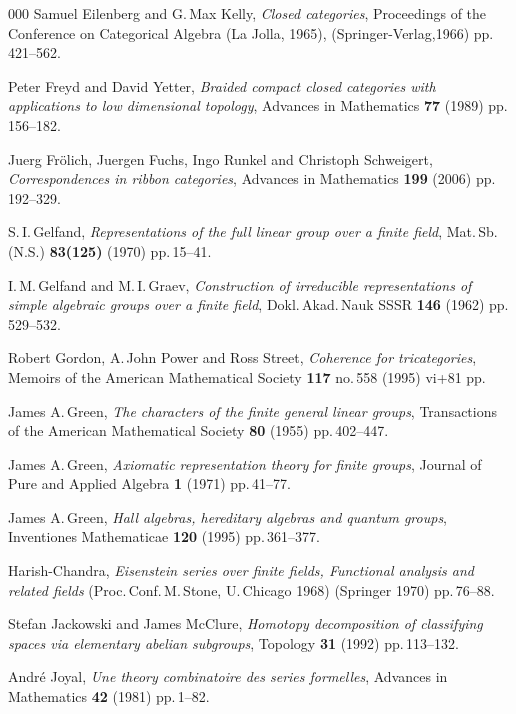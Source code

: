 \documentclass[a4paper,12pt]{article}
\theoremstyle{definition}
\theoremstyle{fact}
\theoremstyle{genquest}
\theoremstyle{step}
\begin{document}
\begin{thebibliography}{000}
 Samuel Eilenberg and G.\,Max Kelly, \textit{Closed categories}, Proceedings of the Conference on Categorical Algebra (La Jolla, 1965), (Springer-Verlag,1966) pp.\,421--562.

 Peter Freyd and David Yetter, \textit{Braided compact closed categories with applications to low dimensional topology}, Advances in Mathematics \textbf{77} (1989) pp.\,156--182.

 Juerg Fr\"olich, Juergen Fuchs, Ingo Runkel and Christoph Schweigert,
\textit{Correspondences in ribbon categories}, Advances in Mathematics \textbf{199} (2006) pp.\,192--329.

 S.\,I.\,Gelfand, \textit{Representations of the full linear group over a finite field}, Mat.\,Sb.\,(N.S.) \textbf{83(125)} (1970) pp.\,15--41.

 I.\,M.\,Gelfand and M.\,I.\,Graev, \textit{Construction of irreducible representations of simple algebraic groups over a finite field}, Dokl.\,Akad.\,Nauk SSSR \textbf{146} (1962) pp.\,529--532.

 Robert Gordon, A.\,John Power and Ross Street, \textit {Coherence for tricategories}, Memoirs of the American Mathematical Society \textbf{117} no.\,558 (1995) vi+81 pp.

 James A.\,Green, \textit{The characters of the finite general linear groups}, Transactions of the American Mathematical Society \textbf{80} (1955) pp.\,402--447. 

 James A.\,Green, \textit{Axiomatic representation theory for finite groups}, Journal of Pure and Applied Algebra \textbf{1} (1971) pp.\,41--77.

 James A.\,Green, \textit{Hall algebras, hereditary algebras and quantum groups}, Inventiones Mathematicae \textbf{120} (1995) pp.\,361--377.

 Harish-Chandra, \textit{Eisenstein series over finite fields, Functional analysis and related fields} (Proc.\,Conf.\,M.\,Stone, U.\,Chicago 1968) (Springer 1970) pp.\,76--88.

 Stefan Jackowski and James McClure, \textit{Homotopy decomposition of classifying spaces via elementary abelian subgroups}, Topology \textbf{31} (1992) pp.\,113--132.

 Andr\'e Joyal, \textit{Une theory combinatoire des series formelles}, Advances in Mathematics \textbf{42} (1981) pp.\,1--82.


\end{thebibliography}
\end{document}
